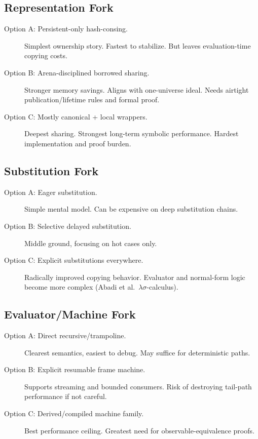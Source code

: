 \documentclass[11pt]{article}
\begin{document}
\subsection{Representation Fork}

\begin{description}
\item[Option A: Persistent-only hash-consing.]
  Simplest ownership story.  Fastest to stabilize.  But leaves
  evaluation-time copying costs.
\item[Option B: Arena-disciplined borrowed sharing.]
  Stronger memory savings.  Aligns with one-universe ideal.  Needs
  airtight publication/lifetime rules and formal proof.
\item[Option C: Mostly canonical + local wrappers.]
  Deepest sharing.  Strongest long-term symbolic performance.  Hardest
  implementation and proof burden.
\end{description}

\subsection{Substitution Fork}

\begin{description}
\item[Option A: Eager substitution.]
  Simple mental model.  Can be expensive on deep substitution chains.
\item[Option B: Selective delayed substitution.]
  Middle ground, focusing on hot cases only.
\item[Option C: Explicit substitutions everywhere.]
  Radically improved copying behavior.  Evaluator and normal-form logic
  become more complex (Abadi et al.\ $\lambda\sigma$-calculus).
\end{description}

\subsection{Evaluator/Machine Fork}

\begin{description}
\item[Option A: Direct recursive/trampoline.]
  Clearest semantics, easiest to debug.  May suffice for deterministic paths.
\item[Option B: Explicit resumable frame machine.]
  Supports streaming and bounded consumers.  Risk of destroying tail-path
  performance if not careful.
\item[Option C: Derived/compiled machine family.]
  Best performance ceiling.  Greatest need for observable-equivalence proofs.
\end{description}
\end{document}
